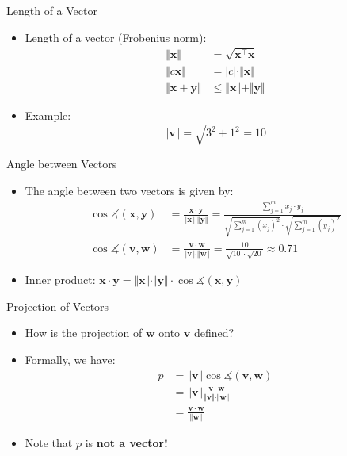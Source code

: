 \begin{frame}{Length of a Vector}{}
	\begin{itemize}
		\item Length of a vector (Frobenius norm):
		\begin{align}
			\Vert \bm{x} \Vert
				&= \sqrt{\bm{x}^{\intercal} \bm{x}}		\\[1mm]
			\Vert c \bm{x} \Vert
				&= \vert c \vert \cdot \Vert \bm{x} \Vert	\\[1mm]
			\Vert \bm{x} + \bm{y} \Vert
				&\le \Vert \bm{x} \Vert + \Vert \bm{y} \Vert
		\end{align}
		\item Example:
		\begin{equation*}
			\Vert \bm{v} \Vert = \sqrt{3^2 + 1^2} = 10
		\end{equation*}
	\end{itemize}
\end{frame}


\begin{frame}{Angle between Vectors}{}
	\begin{itemize}
		\item The angle between two vectors is given by:
		\begin{align}
			\cos \measuredangle (\bm{x}, \bm{y}) &= \frac{\bm{x} \cdot \bm{y}}{\Vert \bm{x} \Vert \cdot \Vert \bm{y} \Vert}
				= \frac{\sum_{j=1}^m x_j \cdot y_j}{\sqrt{\sum_{j=1}^m (x_j)^2} \cdot \sqrt{\sum_{j=1}^m (y_j)^2}} \\[3mm]
			\nonumber
			\cos \measuredangle (\bm{v}, \bm{w}) &= \frac{\bm{v} \cdot \bm{w}}{\Vert \bm{v} \Vert \cdot \Vert \bm{w} \Vert}
				= \frac{10}{\sqrt{10} \cdot \sqrt{20}} \approx 0.71
		\end{align}
		\vspace*{1mm}
		\item Inner product: $\bm{x} \cdot \bm{y}
			= \Vert \bm{x} \Vert \cdot \Vert \bm{y} \Vert \cdot \cos \measuredangle (\bm{x}, \bm{y})$
	\end{itemize}
\end{frame}


\begin{frame}{Projection of Vectors}{}
	\begin{itemize}
		\item How is the projection of $\bm{w}$ onto $\bm{v}$ defined?
		\item Formally, we have:
		\begin{align}
			\nonumber
			p 	&= \Vert \bm{v} \Vert \cos \measuredangle (\bm{v}, \bm{w}) 							\\[1mm]
			\nonumber
				&= \Vert \bm{v} \Vert \frac{\bm{v} \cdot \bm{w}}{\Vert \bm{v} \Vert \cdot \Vert \bm{w} \Vert} 	\\[1mm]
				&= \frac{\bm{v} \cdot \bm{w}}{\Vert \bm{w} \Vert}
		\end{align}
		\item Note that $p$ is \textbf{not a vector!}
	\end{itemize}
\end{frame}


